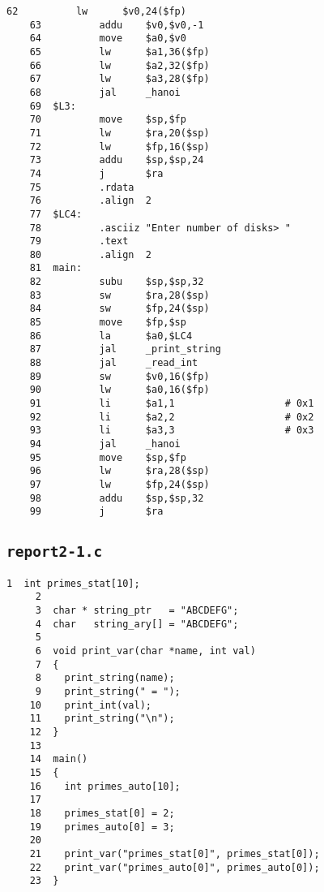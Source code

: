 \begin{Verbatim}[fontsize=\small, baselinestretch=0.8]
    62          lw      $v0,24($fp)
    63          addu    $v0,$v0,-1
    64          move    $a0,$v0
    65          lw      $a1,36($fp)
    66          lw      $a2,32($fp)
    67          lw      $a3,28($fp)
    68          jal     _hanoi
    69  $L3:
    70          move    $sp,$fp
    71          lw      $ra,20($sp)
    72          lw      $fp,16($sp)
    73          addu    $sp,$sp,24
    74          j       $ra
    75          .rdata
    76          .align  2
    77  $LC4:
    78          .asciiz "Enter number of disks> "
    79          .text
    80          .align  2
    81  main:
    82          subu    $sp,$sp,32
    83          sw      $ra,28($sp)
    84          sw      $fp,24($sp)
    85          move    $fp,$sp
    86          la      $a0,$LC4
    87          jal     _print_string
    88          jal     _read_int
    89          sw      $v0,16($fp)
    90          lw      $a0,16($fp)
    91          li      $a1,1                   # 0x1
    92          li      $a2,2                   # 0x2
    93          li      $a3,3                   # 0x3
    94          jal     _hanoi
    95          move    $sp,$fp
    96          lw      $ra,28($sp)
    97          lw      $fp,24($sp)
    98          addu    $sp,$sp,32
    99          j       $ra
\end{Verbatim}

\subsection{\texttt{report2-1.c}} \label{sec:report2-1.c}
\begin{Verbatim}[fontsize=\small, baselinestretch=0.8]
     1	int primes_stat[10];
     2	
     3	char * string_ptr   = "ABCDEFG";
     4	char   string_ary[] = "ABCDEFG";
     5	
     6	void print_var(char *name, int val)
     7	{
     8	  print_string(name);
     9	  print_string(" = ");
    10	  print_int(val);
    11	  print_string("\n");
    12	}
    13	
    14	main()
    15	{
    16	  int primes_auto[10];
    17	
    18	  primes_stat[0] = 2;
    19	  primes_auto[0] = 3;
    20	
    21	  print_var("primes_stat[0]", primes_stat[0]);
    22	  print_var("primes_auto[0]", primes_auto[0]);
    23	}
\end{Verbatim}

